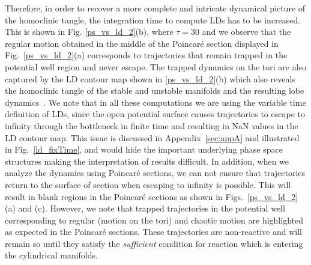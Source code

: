 \documentclass{ws-ijbc}
\begin{document}
Therefore, in order to recover a more complete and intricate dynamical picture of the homoclinic tangle, the integration time to compute LDs has to be increased. This is shown in Fig. \ref{ps_vs_ld_2}(b), where $\tau = 30$ and we observe that the regular motion obtained in the middle of the Poincar\'e section displayed in Fig.~\ref{ps_vs_ld_2}(a) corresponds to trajectories that remain trapped in the potential well region and never escape. The trapped dynamics on the tori are also captured by the LD contour map shown in \ref{ps_vs_ld_2}(b) which also reveals the homoclinic tangle of the stable and unstable manifolds and the resulting lobe dynamics~\cite{beigie_dynamics_1992}. We note that in all these computations we are using the variable time definition of LDs, since the open potential surface causes trajectories to escape to infinity through the bottleneck in finite time and resulting in NaN values in the LD contour map. This issue is discussed in Appendix~\ref{sec:appA} and illustrated in Fig.~\ref{ld_fixTime}, and would hide the important underlying phase space structures making the interpretation of results difficult. In addition, when we analyze the dynamics using Poincar\'e sections, we can not ensure that trajectories return to the surface of section when escaping to infinity is possible. This will result in blank regions in the Poincar\'e sections as shown in Figs.~\ref{ps_vs_ld_2}(a) and (c). However, we note that trapped trajectories in the potential well corresponding to regular (motion on the tori) and chaotic motion are highlighted as expected in the Poincar\'e sections. These trajectories are non-reactive and will remain so until they satisfy the \textit{sufficient} condition for reaction which is entering the cylindrical manifolds.
\end{document}
